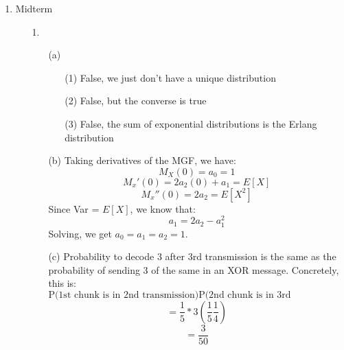 \begin{enumerate}
  \item Midterm
    \begin{enumerate}
      \item [1.]
        \begin{enumerate}
          \item [(a)]
            \begin{enumerate}
              \item [(1)]
                False, we just don't have a unique distribution
              \item [(2)]
                False, but the converse is true
              \item [(3)]
                False, the sum of exponential distributions is the Erlang distribution
            \end{enumerate}

          \item [(b)]
            Taking derivatives of the MGF, we have:
            $$M_X(0) = a_0 = 1$$
            $$M_x'(0) = 2a_2(0) + a_1 = E[X]$$
            $$M_x''(0) = 2a_2 = E[X^2]$$
            Since Var = $E[X]$, we know that:
            $$a_1 = 2a_2 - a_1^2$$
            Solving, we get $a_0 = a_1 = a_2 = 1$.

          \item [(c)]
            Probability to decode 3 after 3rd transmission is the same as the probability of sending 3 of the same in an XOR message. Concretely, this is:
            $$\text{P(1st chunk is in 2nd transmission)P(2nd chunk is in 3rd transmission)}$$
            $$=\frac{1}{5} * 3(\frac{1}{5} \frac{1}{4})$$
            $$=\frac{3}{50}$$


\end{enumerate}
\end{enumerate}
\end{enumerate}
